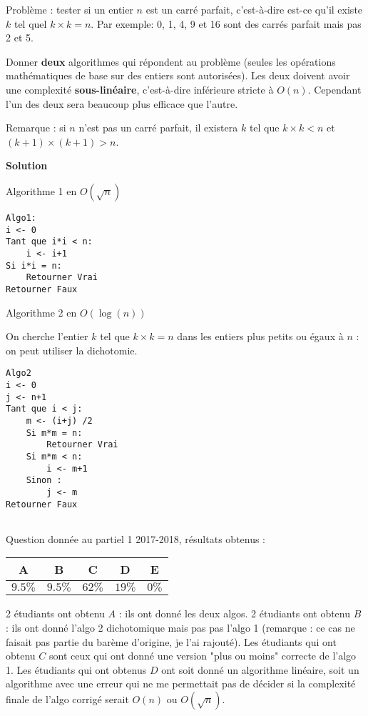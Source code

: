 
\begin{exercice}[Partiel 2017-18]
Problème : tester si un entier $n$ est un carré parfait, c'est-à-dire est-ce qu'il existe $k$ tel quel $k \times k = n$. Par exemple: 0, 1, 4, 9 et 16 sont des carrés parfait mais pas 2 et 5.

Donner \textbf{deux} algorithmes qui répondent au problème (seules les opérations mathématiques de base sur des entiers sont autorisées). Les deux doivent avoir une complexité \textbf{sous-linéaire}, c'est-à-dire inférieure stricte à $O(n)$. Cependant l'un des deux sera beaucoup plus efficace que l'autre.


Remarque : si $n$ n'est pas un carré parfait, il existera $k$ tel que $k\times k <n$ et \linebreak $(k+1) \times (k+1) >n$.

\textbf{Solution}

Algorithme 1 en $O\left(\sqrt{n}\right)$

\begin{lstlisting}
Algo1:
i <- 0
Tant que i*i < n:
    i <- i+1
Si i*i = n:
    Retourner Vrai
Retourner Faux
\end{lstlisting}

Algorithme 2 en $O(\log(n))$

On cherche l'entier $k$ tel que $k \times k = n$ dans les entiers plus petits ou égaux à $n$ : on peut utiliser la dichotomie.  

\begin{lstlisting}
Algo2
i <- 0
j <- n+1
Tant que i < j:
    m <- (i+j) /2
    Si m*m = n:
        Retourner Vrai
    Si m*m < n:
        i <- m+1
    Sinon :
        j <- m
Retourner Faux
    

\end{lstlisting}

Question donnée au partiel 1 2017-2018, résultats obtenus :

\begin{tabular}{|c|c|c|c|c|}
\hline
A & B & C & D & E \\ \hline
$9.5\%$ & $9.5\%$ & $62\%$ & $19\%$ & $0\%$ \\ \hline
\end{tabular} 

2 étudiants ont obtenu $A$ : ils ont donné les deux algos. 2 étudiants ont obtenu $B$ : ils ont donné l'algo 2 dichotomique mais pas pas l'algo 1 (remarque : ce cas ne faisait pas partie du barème d'origine, je l'ai rajouté). Les étudiants qui ont obtenu $C$ sont ceux qui ont donné une version "plus ou moins" correcte de l'algo 1. Les étudiants qui ont obtenus $D$ ont soit donné un algorithme linéaire, soit un algorithme avec une erreur qui ne me permettait pas de décider si la complexité finale de l'algo corrigé serait $O(n)$ ou $O\left(\sqrt{n}\right)$.


\end{exercice}
